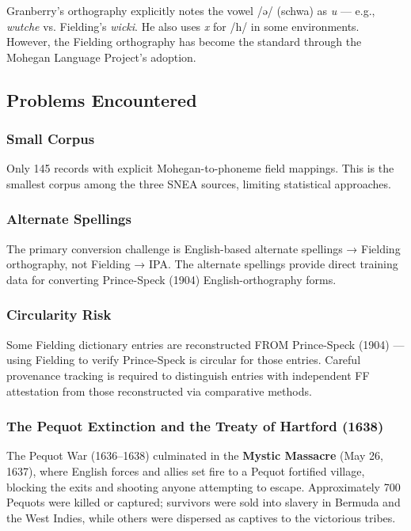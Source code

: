Granberry's orthography explicitly notes the vowel /ə/ (schwa) as \textit{u}
--- e.g., \textit{wutche} vs. Fielding's \textit{wicki}. He also uses
\textit{x} for /h/ in some environments. However, the Fielding orthography
has become the standard through the Mohegan Language Project's adoption.

\subsection{Problems Encountered}

\subsubsection{Small Corpus}

Only 145 records with explicit Mohegan-to-phoneme field mappings. This is the
smallest corpus among the three SNEA sources, limiting statistical approaches.

\subsubsection{Alternate Spellings}

The primary conversion challenge is English-based alternate spellings →
Fielding orthography, not Fielding → IPA. The alternate spellings provide
direct training data for converting Prince-Speck (1904) English-orthography
forms.

\subsubsection{Circularity Risk}

Some Fielding dictionary entries are reconstructed FROM Prince-Speck (1904)
--- using Fielding to verify Prince-Speck is circular for those entries.
Careful provenance tracking is required to distinguish entries with
independent FF attestation from those reconstructed via comparative methods.

\subsubsection{The Pequot Extinction and the Treaty of Hartford (1638)}

The Pequot War (1636--1638) culminated in the \textbf{Mystic Massacre} (May
26, 1637), where English forces and allies set fire to a Pequot fortified
village, blocking the exits and shooting anyone attempting to escape.
Approximately 700 Pequots were killed or captured; survivors were sold into
slavery in Bermuda and the West Indies, while others were dispersed as
captives to the victorious tribes.

